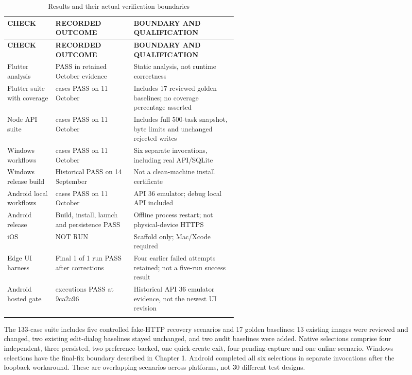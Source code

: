 \documentclass[12pt,a4paper,oneside]{report}
\begin{document}
{\fontsize{11}{14}\selectfont\setlength{\tabcolsep}{4pt}\renewcommand{\arraystretch}{1.15}
\begin{longtable}{@{}>{\raggedright\arraybackslash}p{0.21\linewidth}>{\raggedright\arraybackslash}p{0.34\linewidth}>{\raggedright\arraybackslash}p{}@{}}
\caption{Results and their actual verification boundaries}\\\toprule
\textbf{CHECK} & \textbf{RECORDED OUTCOME} & \textbf{BOUNDARY AND QUALIFICATION} \\ \midrule
\endfirsthead\toprule
\textbf{CHECK} & \textbf{RECORDED OUTCOME} & \textbf{BOUNDARY AND QUALIFICATION} \\ \midrule
\endhead
Flutter analysis & PASS in retained October evidence & Static analysis, not runtime correctness \\ \addlinespace[5pt]
Flutter suite with coverage & 133 cases PASS on 11 October & Includes 17 reviewed golden baselines; no coverage percentage asserted \\ \addlinespace[5pt]
Node API suite & 17 cases PASS on 11 October & Includes full 500-task snapshot, byte limits and unchanged rejected writes \\ \addlinespace[5pt]
Windows workflows & 15 cases PASS on 11 October & Six separate invocations, including real API/SQLite \\ \addlinespace[5pt]
Windows release build & Historical PASS on 14 September & Not a clean-machine install certificate \\ \addlinespace[5pt]
Android local workflows & 15 cases PASS on 11 October & API 36 emulator; debug local API included \\ \addlinespace[5pt]
Android release & Build, install, launch and persistence PASS & Offline process restart; not physical-device HTTPS \\ \addlinespace[5pt]
iOS & NOT RUN & Scaffold only; Mac/Xcode required \\ \addlinespace[5pt]
Edge UI harness & Final 1 of 1 run PASS after corrections & Four earlier failed attempts retained; not a five-run success result \\ \addlinespace[5pt]
Android hosted gate & 9 executions PASS at 9ca2a96 & Historical API 36 emulator evidence, not the newest UI revision \\ \addlinespace[5pt]
\bottomrule\end{longtable}}
The 133-case suite includes five controlled fake-HTTP recovery scenarios and 17 golden baselines: 13 existing images were reviewed and changed, two existing edit-dialog baselines stayed unchanged, and two audit baselines were added. Native selections comprise four independent, three persisted, two preference-backed, one quick-create exit, four pending-capture and one online scenario. Windows selections have the final-fix boundary described in Chapter 1. Android completed all six selections in separate invocations after the loopback workaround. These are overlapping scenarios across platforms, not 30 different test designs.
\end{document}
